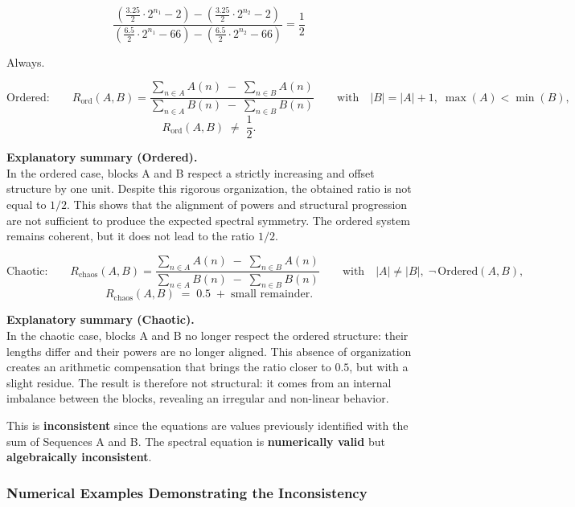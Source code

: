 \documentclass[a4paper,11pt]{article}
\begin{document}
\[
\frac{
\left(\frac{3.25}{2} \cdot 2^{n_{1}} - 2\right)
-
\left(\frac{3.25}{2} \cdot 2^{n_{2}} - 2\right)
}{
\left(\frac{6.5}{2} \cdot 2^{n_{1}} - 66\right)
-
\left(\frac{6.5}{2} \cdot 2^{n_{2}} - 66\right)
}
= \frac{1}{2}
\]

Always.

\[
\text{Ordered:}\qquad
R_{\mathrm{ord}}(A,B)
=
\frac{\displaystyle \sum_{n \in A} A(n)\;-\;\sum_{n \in B} A(n)}
     {\displaystyle \sum_{n \in A} B(n)\;-\;\sum_{n \in B} B(n)}
\qquad\text{with}\quad |B| = |A| + 1,\; \max(A) < \min(B),
\]
\[
R_{\mathrm{ord}}(A,B) \;\neq\; \frac{1}{2}.
\]

\textbf{Explanatory summary (Ordered).} \\
In the ordered case, blocks A and B respect a strictly increasing
and offset structure by one unit. Despite this rigorous organization, the obtained ratio is
not equal to $1/2$. This shows that the alignment of powers and structural progression
are not sufficient to produce the expected spectral symmetry. The ordered system
remains coherent, but it does not lead to the ratio $1/2$.

\[
\text{Chaotic:}\qquad
R_{\mathrm{chaos}}(A,B)
=
\frac{\displaystyle \sum_{n \in A} A(n)\;-\;\sum_{n \in B} A(n)}
     {\displaystyle \sum_{n \in A} B(n)\;-\;\sum_{n \in B} B(n)}
\qquad\text{with}\quad |A| \neq |B|,\; \neg\,\text{Ordered}(A,B),
\]
\[
R_{\mathrm{chaos}}(A,B) \;=\; 0.5 \;+\; \text{small remainder}.
\]

\textbf{Explanatory summary (Chaotic).} \\
In the chaotic case, blocks A and B no longer respect the ordered structure:
their lengths differ and their powers are no longer aligned. This absence
of organization creates an arithmetic compensation that brings the ratio closer to $0.5$,
but with a slight residue. The result is therefore not structural: it comes from an
internal imbalance between the blocks, revealing an irregular and non-linear behavior.

\begin{tcolorbox}[colback=red!5,colframe=red!75,title={\textbf{Warning: Algebraic Inconsistency}}]
This is \textbf{inconsistent} since the equations are values previously identified with the sum of Sequences A and B. The spectral equation is \textbf{numerically valid} but \textbf{algebraically inconsistent}.
\end{tcolorbox}

\subsubsection{Numerical Examples Demonstrating the Inconsistency}
\end{document}
